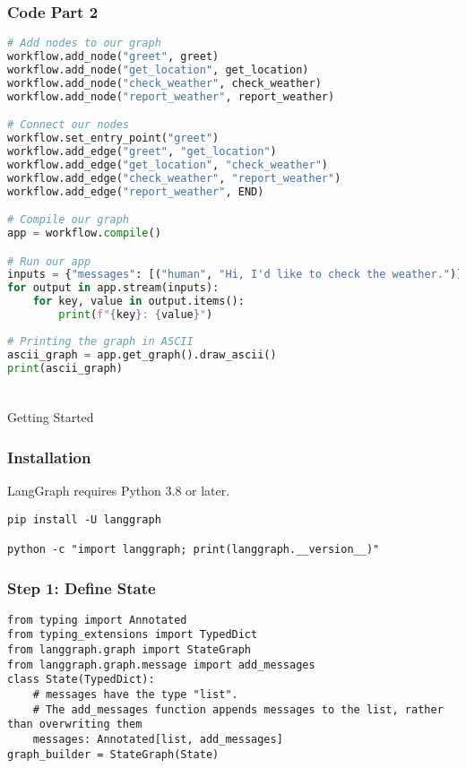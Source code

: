 \begin{frame}[fragile]\frametitle{Code Part 2}
      \begin{lstlisting}[language=Python, basicstyle=\tiny]
# Add nodes to our graph
workflow.add_node("greet", greet)
workflow.add_node("get_location", get_location)
workflow.add_node("check_weather", check_weather)
workflow.add_node("report_weather", report_weather)

# Connect our nodes
workflow.set_entry_point("greet")
workflow.add_edge("greet", "get_location")
workflow.add_edge("get_location", "check_weather")
workflow.add_edge("check_weather", "report_weather")
workflow.add_edge("report_weather", END)

# Compile our graph
app = workflow.compile()

# Run our app
inputs = {"messages": [("human", "Hi, I'd like to check the weather.")]}
for output in app.stream(inputs):
    for key, value in output.items():
        print(f"{key}: {value}")
	
# Printing the graph in ASCII	
ascii_graph = app.get_graph().draw_ascii()
print(ascii_graph)	
	
      \end{lstlisting}
\end{frame}


\begin{frame}[fragile]\frametitle{}
\begin{center}
{\Large Getting Started}
\end{center}
\end{frame}

\begin{frame}[fragile]\frametitle{Installation}
LangGraph requires Python 3.8 or later. 

      \begin{lstlisting}
pip install -U langgraph

python -c "import langgraph; print(langgraph.__version__)"
      \end{lstlisting}
\end{frame}

\begin{frame}[fragile]\frametitle{Step 1: Define State}


      \begin{lstlisting}
from typing import Annotated
from typing_extensions import TypedDict
from langgraph.graph import StateGraph
from langgraph.graph.message import add_messages
class State(TypedDict):
    # messages have the type "list".
    # The add_messages function appends messages to the list, rather than overwriting them
    messages: Annotated[list, add_messages]
graph_builder = StateGraph(State)
      \end{lstlisting}
\end{frame}


